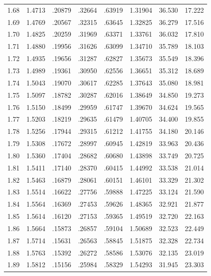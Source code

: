 \begin{minipage}{0.49\textwidth}
{\begin{tabular}{c|c|c|c|c|c|c|c}
        1.68 & 1.4713 & .20879 & .32664 & .63919 & 1.31904 & 36.530 & 17.222 \\
        1.69 & 1.4769 & .20567 & .32315 & .63645 & 1.32825 & 36.279 & 17.516 \\
        1.70 & 1.4825 & .20259 & .31969 & .63371 & 1.33761 & 36.032 & 17.810 \\
        1.71 & 1.4880 & .19956 & .31626 & .63099 & 1.34710 & 35.789 & 18.103 \\
        1.72 & 1.4935 & .19656 & .31287 & .62827 & 1.35673 & 35.549 & 18.396 \\
        1.73 & 1.4989 & .19361 & .30950 & .62556 & 1.36651 & 35.312 & 18.689 \\
        1.74 & 1.5043 & .19070 & .30617 & .62285 & 1.37643 & 35.080 & 18.981 \\
        1.75 & 1.5097 & .18782 & .30287 & .62016 & 1.38649 & 34.850 & 19.273 \\
        1.76 & 1.5150 & .18499 & .29959 & .61747 & 1.39670 & 34.624 & 19.565 \\
        1.77 & 1.5203 & .18219 & .29635 & .61479 & 1.40705 & 34.400 & 19.855 \\
        1.78 & 1.5256 & .17944 & .29315 & .61212 & 1.41755 & 34.180 & 20.146 \\
        1.79 & 1.5308 & .17672 & .28997 & .60945 & 1.42819 & 33.963 & 20.436 \\
        1.80 & 1.5360 & .17404 & .28682 & .60680 & 1.43898 & 33.749 & 20.725 \\
        1.81 & 1.5411 & .17140 & .28370 & .60415 & 1.44992 & 33.538 & 21.014 \\
        1.82 & 1.5463 & .16879 & .28061 & .60151 & 1.46101 & 33.329 & 21.302 \\
        1.83 & 1.5514 & .16622 & .27756 & .59888 & 1.47225 & 33.124 & 21.590 \\
        1.84 & 1.5564 & .16369 & .27453 & .59626 & 1.48365 & 32.921 & 21.877 \\
        1.85 & 1.5614 & .16120 & .27153 & .59365 & 1.49519 & 32.720 & 22.163 \\
        1.86 & 1.5664 & .15873 & .26857 & .59104 & 1.50689 & 32.523 & 22.449 \\
        1.87 & 1.5714 & .15631 & .26563 & .58845 & 1.51875 & 32.328 & 22.734 \\
        1.88 & 1.5763 & .15392 & .26272 & .58586 & 1.53076 & 32.135 & 23.019 \\
        1.89 & 1.5812 & .15156 & .25984 & .58329 & 1.54293 & 31.945 & 23.303 \\

\end{tabular}}
\end{minipage}
